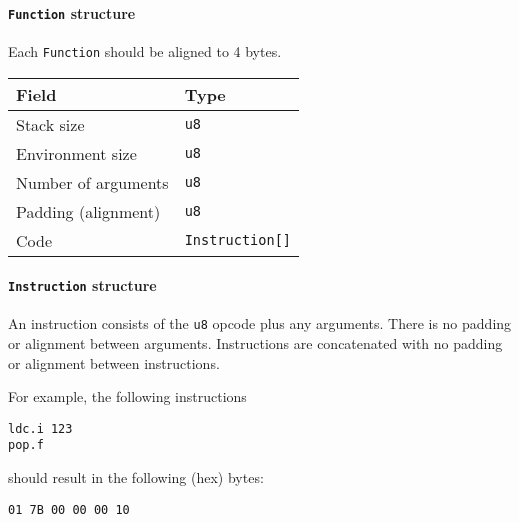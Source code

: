 \paragraph{\texorpdfstring{\texttt{Function}
structure}{Function structure}}

Each \texttt{Function} should be aligned to 4 bytes.

\medskip

\begin{tabular}{ll}
\toprule
Field & Type\tabularnewline
\midrule
Stack size & \texttt{u8}\tabularnewline
Environment size & \texttt{u8}\tabularnewline
Number of arguments & \texttt{u8}\tabularnewline
Padding (alignment) & \texttt{u8}\tabularnewline
Code & \texttt{Instruction{[}{]}}\tabularnewline
\bottomrule
\end{tabular}

\paragraph{\texorpdfstring{\texttt{Instruction}
structure}{Instruction structure}}

An instruction consists of the \texttt{u8} opcode plus any arguments.
There is no padding or alignment between arguments. Instructions are
concatenated with no padding or alignment between instructions.

For example, the following instructions

\begin{verbatim}
ldc.i 123
pop.f
\end{verbatim}

should result in the following (hex) bytes:

\begin{verbatim}
01 7B 00 00 00 10
\end{verbatim}

